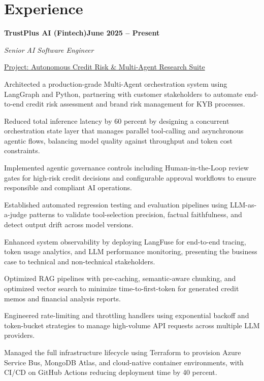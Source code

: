 \documentclass[letterpaper,10pt]{article}
\newcommand{\headingBf}[2]{\par\noindent\hspace*{10pt}\textbf{#1}\hfill\textbf{#2}}
\newcommand{\headingIt}[2]{\par\noindent\hspace*{10pt}\textit{#1}\hfill\textit{#2}}
\newenvironment{resume_list}{\vspace{-7pt}\begin{itemize}[itemsep=-2px, parsep=1pt, leftmargin=30pt]}{\end{itemize}}
\newcommand{\itemTitle}[1]{\item[] \underline{#1}\vspace{4pt}}
\begin{document}
  \section{Experience}

  \headingBf{TrustPlus AI (Fintech)}{June 2025 -- Present}
  \headingIt{Senior AI Software Engineer}{}
  \begin{resume_list}
    \itemTitle{Project: Autonomous Credit Risk \& Multi-Agent Research Suite}
    \item Architected a production-grade Multi-Agent orchestration system using LangGraph and Python, partnering with customer stakeholders to automate end-to-end credit risk assessment and brand risk management for KYB processes.
    \item Reduced total inference latency by 60 percent by designing a concurrent orchestration state layer that manages parallel tool-calling and asynchronous agentic flows, balancing model quality against throughput and token cost constraints.
    \item Implemented agentic governance controls including Human-in-the-Loop review gates for high-risk credit decisions and configurable approval workflows to ensure responsible and compliant AI operations.
    \item Established automated regression testing and evaluation pipelines using LLM-as-a-judge patterns to validate tool-selection precision, factual faithfulness, and detect output drift across model versions.
    \item Enhanced system observability by deploying LangFuse for end-to-end tracing, token usage analytics, and LLM performance monitoring, presenting the business case to technical and non-technical stakeholders.
    \item Optimized RAG pipelines with pre-caching, semantic-aware chunking, and optimized vector search to minimize time-to-first-token for generated credit memos and financial analysis reports.
    \item Engineered rate-limiting and throttling handlers using exponential backoff and token-bucket strategies to manage high-volume API requests across multiple LLM providers.
    \item Managed the full infrastructure lifecycle using Terraform to provision Azure Service Bus, MongoDB Atlas, and cloud-native container environments, with CI/CD on GitHub Actions reducing deployment time by 40 percent.
  \end{resume_list}
\end{document}
